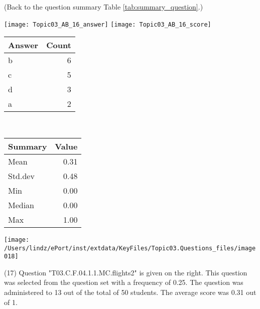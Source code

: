 \documentclass[12pt,english,nohyper]{tufte-handout}\usepackage[]{graphicx}\usepackage[]{color}
\begin{document}
 (Back to the question summary Table \ref{tab:summary_question}.)

\begin{center} \texttt{[image: Topic03\_AB\_16\_answer]} \texttt{[image: Topic03\_AB\_16\_score]} \end{center} 

\begin{center}%
\begin{tabular}{lr}
  \hline
Answer & Count \\ 
  \hline
b &   6 \\ 
  c &   5 \\ 
  d &   3 \\ 
  a &   2 \\ 
   \hline
\end{tabular}
~~~~~~~~%
\begin{tabular}{lr}
  \hline
Summary & Value \\ 
  \hline
Mean & 0.31 \\ 
  Std.dev & 0.48 \\ 
  Min & 0.00 \\ 
  Median & 0.00 \\ 
  Max & 1.00 \\ 
   \hline
\end{tabular}
\end{center}\newpage{}



\vspace{4cm}\begin{marginfigure}\texttt{[image: /Users/lindz/ePort/inst/extdata/KeyFiles/Topic03.Questions\_files/image018]}\end{marginfigure}\vspace{-4cm} (17) Question "T03.C.F.04.1.1.MC.flights2" is given on the right. This question was selected from the question set with a frequency of 0.25. The question was administered to 13 out of the total of 50 students. The average score was 0.31 out of 1.
\end{document}
